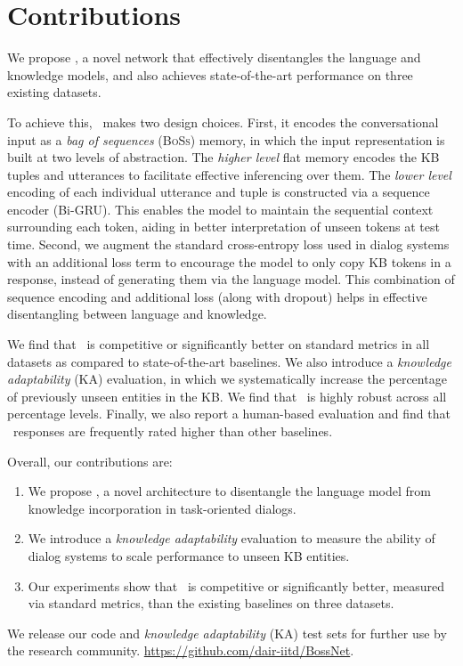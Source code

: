 \section{Contributions}

We propose \sys, a novel network that effectively disentangles the language and knowledge models, and also achieves state-of-the-art performance on three existing datasets. 

To achieve this, \sys\ makes two design choices. First, it encodes the conversational input as a {\em bag of sequences} (\textsc{BoSs}) memory, in which the input representation is built at two levels of abstraction. The \emph{higher level} flat memory encodes the KB tuples and utterances to facilitate effective inferencing over them. The \emph{lower level} encoding of each individual utterance and tuple is constructed via a sequence encoder (Bi-GRU). This enables the model to maintain the sequential context surrounding each token, aiding in better interpretation of unseen tokens at test time. Second, we augment the standard cross-entropy loss used in dialog systems with an additional loss term to encourage the model to only copy KB tokens in a response, instead of generating them via the language model. This combination of sequence encoding and additional loss (along with dropout) helps in effective disentangling between language and knowledge. 

We find that \sys\ is competitive or significantly better on standard metrics in all datasets as compared to state-of-the-art baselines. We also introduce a {\em knowledge adaptability} (KA) evaluation, in which we systematically increase the percentage of previously unseen entities in the KB. We find that \sys\ is highly robust across all percentage levels. Finally, we also report a human-based evaluation and find that \sys\ responses are frequently rated higher than other baselines.

Overall, our contributions are:

\begin{enumerate}
 \item We propose \sys, a novel architecture to disentangle the language model from knowledge incorporation in task-oriented dialogs.
 \item We introduce a {\em knowledge adaptability} evaluation to measure the ability of dialog systems to scale performance to unseen KB entities.
 \item Our experiments show that \sys\ is competitive or significantly better, measured via standard metrics, than the existing baselines on three datasets.
\end{enumerate}

We release our code and {\em knowledge adaptability} (KA) test sets for further use by the research community. \url{ https://github.com/dair-iitd/BossNet}.


